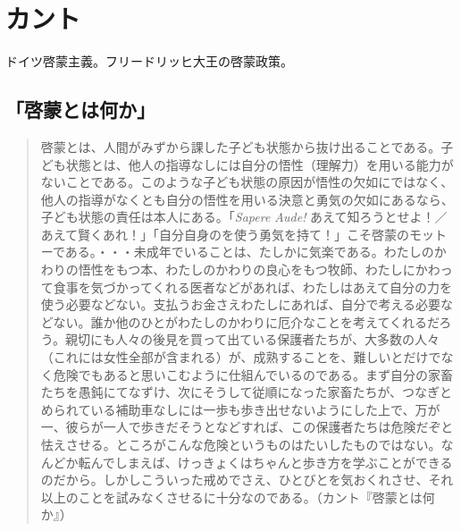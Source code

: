\documentclass[uplatex,dvipdfmx]{jsarticle} \usepackage{mystyle}%
\begin{document}





\section{カント}

ドイツ啓蒙主義。フリードリッヒ大王の啓蒙政策。

\subsection{「啓蒙とは何か」}

\begin{quotation}
  
  啓蒙とは、人間がみずから課した子ども状態から抜け出ることである。子ども状態とは、他人の指導なしには自分の悟性（理解力）を用いる能力がないことである。このような子ども状態の原因が悟性の欠如にではなく、他人の指導がなくとも自分の悟性を用いる決意と勇気の欠如にあるなら、子ども状態の責任は本人にある。「\emph{Sapere Aude!} あえて知ろうとせよ！／あえて賢くあれ！」「自分自身のを使う勇気を持て！」こそ啓蒙のモットーである。・・・未成年でいることは、たしかに気楽である。わたしのかわりの悟性をもつ本、わたしのかわりの良心をもつ牧師、わたしにかわって食事を気づかってくれる医者などがあれば、わたしはあえて自分の力を使う必要などない。支払うお金さえわたしにあれば、自分で考える必要などない。誰か他のひとがわたしのかわりに厄介なことを考えてくれるだろう。親切にも人々の後見を買って出ている保護者たちが、大多数の人々（これには女性全部が含まれる）が、成熟することを、難しいとだけでなく危険でもあると思いこむように仕組んでいるのである。まず自分の家畜たちを愚鈍にてなずけ、次にそうして従順になった家畜たちが、つなぎとめられている補助車なしには一歩も歩き出せないようにした上で、万が一、彼らが一人で歩きだそうとなどすれば、この保護者たちは危険だぞと怯えさせる。ところがこんな危険というものはたいしたものではない。なんどか転んでしまえば、けっきょくはちゃんと歩き方を学ぶことができるのだから。しかしこういった戒めでさえ、ひとびとを気おくれさせ、それ以上のことを試みなくさせるに十分なのである。（カント『啓蒙とは何か』）
\end{quotation}
\end{document}
